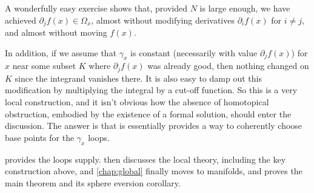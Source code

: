 A wonderfully easy exercise shows that, provided $N$ is large enough,
we have achieved $∂_j f(x) ∈ Ω_x$, almost without modifying
derivatives $∂_i f(x)$ for $i ≠ j$, and almost without moving
$f(x)$.

In addition, if we assume that $γ_x$ is constant (necessarily with value
$∂_j f(x)$) for $x$ near some subset $K$ where
$∂_j f(x)$ was already good, then nothing changed on $K$ since the
integrand vanishes there. It is also easy to damp out this modification
by multiplying the integral by a cut-off function. So this is a very
local construction, and it isn't obvious how the absence of homotopical
obstruction, embodied by the existence of a formal solution, should
enter the discussion. The answer is that is essentially provides a way
to coherently choose base points for the $γ_x$ loops.

 provides the loops supply.  then
discusses the local theory, including the key construction above,
and \cref{chap:global} finally moves to manifolds, and proves the main
theorem and its sphere eversion corollary.

